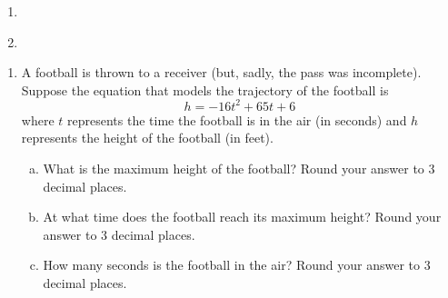 \begin{multicols}{2}
\begin{enumerate}	\setcounter{enumi}{\value{Review}}
\item \mbox{} \newline\\
\item \mbox{} \newline\\
\end{enumerate}	\setcounter{Review}{\value{enumi}}
\end{multicols}

\begin{enumerate}	\setcounter{enumi}{\value{Review}}
\item A football is thrown to a receiver (but, sadly, the pass was incomplete). Suppose the equation that models the trajectory of the football is 
\[
h = -16t^2 + 65t + 6
\]
where $t$ represents the time the football is in the air (in seconds) and $h$ represents the height of the football (in feet).

\begin{enumerate}[(a)]
    \item What is the maximum height of the football? Round your answer to 3 decimal places.
    \item At what time does the football reach its maximum height? Round your answer to 3 decimal places.
    \item How many seconds is the football in the air? Round your answer to 3 decimal places.
\end{enumerate}
\end{enumerate}	\setcounter{Review}{\value{enumi}}

